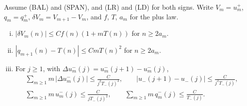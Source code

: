 \begin{lemma}[consequences]\label{lem:diffs}
Assume (BAL) and (SPAN), and (LR) and (LD) for both signs. Write $V_m=u^\plus_m$, $q_m=q^\plus_m$,
$\delta V_m=V_{m+1}-V_m$, and $f$, $T$, $a_m$ for the plus law.
\begin{enumerate}[(i)]
\item $|\delta V_m(n)|\le Cf(n)(1+mT(n))$ for $n\ge2a_m$.
\item $|q_{m+1}(n)-T(n)|\le CmT(n)^2$ for $n\ge2a_m$.
\item For $j\ge1$, with $\Delta u^\minus_m(j)=u^\minus_m(j+1)-u^\minus_m(j)$,
\begin{gather*}
 \sum_{m\ge1}m\,|\Delta u^\minus_m(j)|\le\frac C{j^2T_\minus(j)^2},\qquad
 |u_\minus(j+1)-u_\minus(j)|\le\frac C{j^2T_\minus(j)},\\
 \sum_{m\ge1}m\,u^\minus_m(j)\le\frac C{jT_\minus(j)^2},\qquad
 \sum_{m\ge1}m\,q^\minus_m(j)\le\frac C{T_\minus(j)} .
\end{gather*}
\end{enumerate}
\end{lemma}

